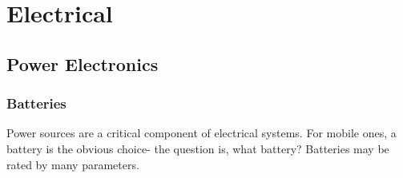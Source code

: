 \chapter{Electrical}

\section{Power Electronics}

\subsection{Batteries}
Power sources are a critical component of electrical systems. For mobile ones, a battery is the obvious choice- the question is, what battery? Batteries may be rated by many parameters.

